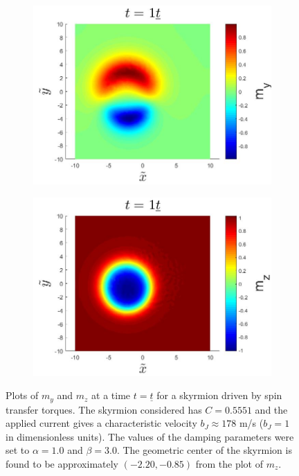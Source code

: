 \begin{figure}[h!]
\centering
\begin{subfigure}{.45\textwidth}
  \centering
  \includegraphics[width=\linewidth]{Figures/SkyrmionMySTTa1b3.jpg}
  \caption{}
\end{subfigure}
\begin{subfigure}{.45\textwidth}
  \centering
  \includegraphics[width=\linewidth]{Figures/SkyrmionMzSTTa1b3.jpg}
  \caption{}
\end{subfigure}
\caption{Plots of $m_y$ and $m_z$ at a time $t=\underline{t}$ for a skyrmion driven by spin transfer torques. The skyrmion considered has $C=0.5551$ and the applied current gives a characteristic velocity $b_J\approx 178$ m/s ($b_J=1$ in dimensionless units). The values of the damping parameters were set to $\alpha=1.0$ and $\beta=3.0$. The geometric center of the skyrmion is found to be approximately $\left(-2.20, -0.85\right)$ from the plot of $m_z$.}
\label{fig:SkyrmionMotionSTTa1b3}
\end{figure}
